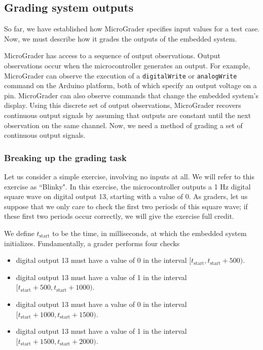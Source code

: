 \documentclass[12pt]{article}
\begin{document}
\subsection{Grading system outputs}
\label{sec:eval-point}
So far, we have established how MicroGrader specifies input values for a test case.  Now, we must describe how it grades the outputs of the embedded system.

MicroGrader has access to a sequence of output observations.  Output observations occur when the microcontroller generates an output.  For example, MicroGrader can observe the execution of a \texttt{digitalWrite} or \texttt{analogWrite} command on the Arduino platform, both of which specify an output voltage on a pin.  MicroGrader can also observe commands that change the embedded system's display.  Using this discrete set of output observations, MicroGrader recovers continuous output signals by assuming that outputs are constant until the next observation on the same channel.  Now, we need a method of grading a set of continuous output signals.


\subsubsection{Breaking up the grading task}
Let us consider a simple exercise, involving no inputs at all.  We will refer to this exercise as ``Blinky".  In this exercise, the microcontroller outputs a 1 Hz digital square wave on digital output 13, starting with a value of 0.  As graders, let us suppose that we only care to check the first two periods of this square wave; if these first two periods occur correctly, we will give the exercise full credit.

We define $t_{\text{start}}$ to be the time, in milliseconds, at which the embedded system initializes.  Fundamentally, a grader performs four checks

\begin{itemize}
\item digital output 13 must have a value of 0 in the interval $[t_{\text{start}},t_{\text{start}}+500)$.
\item digital output 13 must have a value of 1 in the interval $[t_{\text{start}}+500,t_{\text{start}}+1000)$.
\item digital output 13 must have a value of 0 in the interval $[t_{\text{start}}+1000,t_{\text{start}}+1500)$.
\item digital output 13 must have a value of 1 in the interval $[t_{\text{start}}+1500,t_{\text{start}}+2000)$.
\end{itemize}
\end{document}
